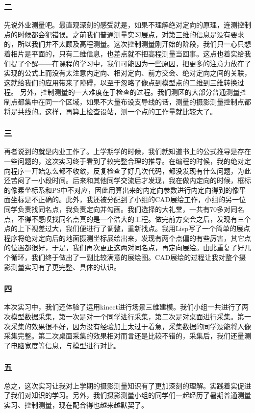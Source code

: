 \subsubsection{二}
先说外业测量吧。最直观深刻的感受就是，如果不理解绝对定向的原理，连测控制点的时候都会犯错误。之前我们普通测量实习展点，对第三维的信息是没有要求的，所以我们并不太顾及高程测量。这次控制测量刚开始的阶段，我们只一心只想着相片是平面的，只有二维信息，也差点就不把高程测量当回事。这点也着实给我们提了个醒——在课程的学习中，我们可能因为一些原因，把更多的注意力放在了实现的公式上而没有太注意内定向、相对定向、前方交会、绝对定向之间的关联，这就给我们的应用带来了障碍，以至于忽略了像点到模型点的二维到三维转换过程。
另外，控制测量的一大难度在于检查的过程。我们测区的大部分普通测量控制点都集中在同一个区域，如果不大量布设支导线的话，测量的摄影测量控制点都将是共线的。这样，再算上检查设站，测一个点的工作量就比较大了。

\subsubsection{三}
再者说到的就是内业工作了。上学期学的时候，我们就知道书上的公式推导是存在一些问题的，这次实习终于看到了较完整合理的推导。在编程的时候，我的绝对定向程序一开始怎么都不收敛，反复检查了好几次代码，都没发现有什么问题，为此还苦闷了一小段时间。后来和其他同学交流后才发现，我在做内定向的时候，框标的像素坐标系和PS中不对应，因此用算出来的内定向参数进行内定向得到的像平面坐标是不正确的。此外，我还被分配到了小组的CAD展绘工作，小组的另一位同学负责找同名点，我负责定向并勾画。我们选择的大礼堂，一共有70多对同名点，不得不感叹找同名点真的是一个浩大的工程。做完前方交会之后，发现有三个点的上下视差过大，我们便进行了调整，重新找点。我用Lisp写了一个简单的展点程序将绝对定向后的地面摄测坐标展绘出来，发现有两个点偏的有些厉害，其它点的位置都很好，于是，我们再次更正这两对同名点，再定向展绘。由此重复了好几个循环，我们终于做出了一副比较满意的展绘图。CAD展绘的过程让我对整个摄影测量实习有了更完整、具体的认识。

\subsubsection{四}
本次实习中，我们还体验了运用kinect进行场景三维建模。我们小组一共进行了两次模型数据采集，第一次是对一个同学进行采集，第二次是对桌面进行采集。第一次采集的效果很不好，因为没有经验加上太过于着急，采集数据的同学没能将人像采集完整。第二次桌面采集的效果相对而言还是比较不错的，采集后，我们还量测了电脑宽度等信息，与模型进行对比。

\subsubsection{五}
总之，这次实习让我对上学期的摄影测量知识有了更加深刻的理解。实践着实促进了我们对知识的学习。另外，我们摄影测量小组的同学们一起经历了暑期普通测量实习、控制测量，现在配合得也越来越默契了。








